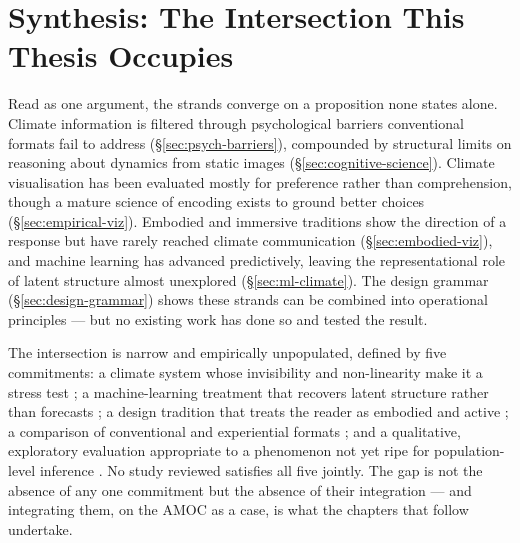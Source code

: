 \section{Synthesis: The Intersection This Thesis Occupies}
\label{sec:literature-synthesis}

Read as one argument, the strands converge on a proposition none states alone. Climate information is filtered through psychological barriers conventional formats fail to address (\S\ref{sec:psych-barriers}), compounded by structural limits on reasoning about dynamics from static images (\S\ref{sec:cognitive-science}). Climate visualisation has been evaluated mostly for preference rather than comprehension, though a mature science of encoding exists to ground better choices (\S\ref{sec:empirical-viz}). Embodied and immersive traditions show the direction of a response but have rarely reached climate communication (\S\ref{sec:embodied-viz}), and machine learning has advanced predictively, leaving the representational role of latent structure almost unexplored (\S\ref{sec:ml-climate}). The design grammar (\S\ref{sec:design-grammar}) shows these strands can be combined into operational principles --- but no existing work has done so and tested the result.

The intersection is narrow and empirically unpopulated, defined by five commitments: a climate system whose invisibility and non-linearity make it a stress test \citep{lenton2008, armstrongmckay2022}; a machine-learning treatment that recovers latent structure rather than forecasts \citep{sonnewald2019, iten2020}; a design tradition that treats the reader as embodied and active \citep{lakoff1999, jansen2015, marriott2018}; a comparison of conventional and experiential formats \citep{harold2016, kause2020}; and a qualitative, exploratory evaluation appropriate to a phenomenon not yet ripe for population-level inference \citep{braunclarke2006}. No study reviewed satisfies all five jointly. The gap is not the absence of any one commitment but the absence of their integration --- and integrating them, on the AMOC as a case, is what the chapters that follow undertake.